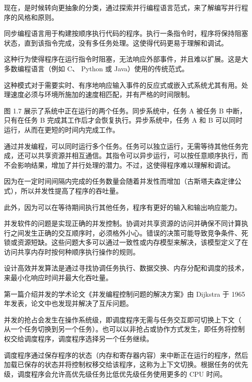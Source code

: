 现在，是时候转向更抽象的分类，通过探索并行编程语言范式，来了解编写并行程序的风格和原则。


同步编程语言用于构建按顺序执行代码的程序。执行一条指令时，程序将保持阻塞状态，直到该指令完成，没有多任务处理。这使得代码更易于理解和调试。

这种行为使得程序在运行指令时阻塞，无法响应外部事件，并且难以扩展。这是大多数编程语言（例如 C、 Python 或 Java）使用的传统范式。

这种模式对于需要实时、有序地响应输入事件的反应式或嵌入式系统尤其有用。处理速度必须与环境所施加的速度相匹配，并有严格的时间限制。


图 1.7 展示了系统中正在运行的两个任务。同步系统中，任务 A 被任务 B 中断，只有在任务 B 完成其工作后才会恢复执行。异步系统中，任务 A 和 B 可以同时运行，从而在更短的时间内完成工作。


通过并发编程，可以同时运行多个任务。任务可以独立运行，无需等待其他任务完成，还可以共享资源并相互通信。其指令可以异步运行，可以按任意顺序执行，而不会影响结果，增加了并行处理的潜力。不过，这使得程序难以理解和调试。

因为在一定时间间隔内完成的任务数量会随着并发性而增加（古斯塔夫森定律公式），所以并发性提高了程序的吞吐量。

此外，因为可以在等待期间执行其他任务，程序有更好的输入和输出响应能力。

并发软件的问题是实现正确的并发控制。协调对共享资源的访问并确保不同计算执行之间发生正确的交互顺序时，必须格外小心。错误的决策可能导致竞争条件、死锁或资源短缺。这些问题大多可以通过一致性或内存模型来解决，该模型定义了在访问共享内存时按何种顺序执行操作的规则。

设计高效并发算法是通过寻找协调任务执行、数据交换、内存分配和调度的技术，来最小化响应时间并最大化吞吐量。

第一篇介绍并发的学术论文《并发编程控制问题的解决方案》由 Dijkstra 于 1965 年发表，论文中也发现并解决了互斥问题。

并发的抢占会发生在操作系统级，即调度程序无需与任务交互即可切换上下文（ 从一个任务切换到另一个任务）。也可以以非抢占或协作方式发生，即任务将控制权交给调度程序，调度程序选择另一个任务继续。

调度程序通过保存程序的状态（内存和寄存器内容）来中断正在运行的程序，然后加载已保存的状态并将控制权移交给该程序，这称为上下文切换。根据任务的优先级，调度程序会允许高优先级任务比低优先级任务使用更多的 CPU 时间。

